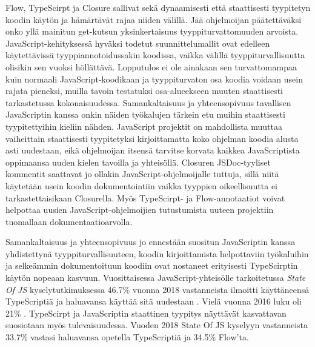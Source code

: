 Flow, TypeScirpt ja Closure sallivat sekä dynaamisesti että
staattisesti tyypitetyn koodin käytön ja hämärtävät rajaa niiden välillä.
Jää ohjelmoijan päätettäväksi onko yllä mainitun get-kutsun yksinkertaisuus
tyyppiturvattomuuden arvoista. JavaScript-kehityksessä hyväksi todetut
suunnittelumallit ovat edelleen käytettävissä tyyppiannotoidussakin
koodissa, vaikka välillä tyyppiturvallisuutta olisikin sen vuoksi höllättävä.
Lopputulos ei ole ainakaan sen turvattomampaa kuin normaali JavaScript-koodikaan
ja tyyppiturvaton osa koodia voidaan usein rajata pieneksi, muilla tavoin
testatuksi osa-alueekseen muuten staattisesti tarkastetussa kokonaisuudessa.
Samankaltaisuus ja yhteensopivuus tavallisen JavaScriptin kanssa onkin
näiden työkalujen tärkein etu muihin staattisesti tyypitettyihin kieliin
nähden. JavaScript projektit on mahdollista muuttaa vaiheittain staattisesti
tyypitetyksi kirjoittamatta koko ohjelman koodia alusta asti uudestaan, eikä
ohjelmoijan itsensä tarvitse korvata kaikkea JavaScriptista oppimaansa
uuden kielen tavoilla ja yhteisöllä. Closuren JSDoc-tyyliset kommentit
saattavat jo ollakin JavaScript-ohjelmoijalle tuttuja, sillä niitä käytetään
usein koodin dokumentointiin vaikka tyyppien oikeellisuutta ei
tarkastettaisikaan Closurella. Myös TypeScirpt- ja Flow-annotaatiot voivat
helpottaa uusien JavaScript-ohjelmoijien tutustumista uuteen projektiin
tuomallaan dokumentaatioarvolla.

Samankaltaisuus ja yhteensopivuus jo ennestään suositun JavaScriptin kanssa
yhdistettynä tyyppiturvallisuuteen, koodin kirjoittamista helpottaviin
työkaluihin ja selkeämmin dokumentoituun koodiin ovat nostaneet erityisesti
TypeScirptin käytön nopeaan kasvuun. Vuosittaisessa JavaScript-yhteisölle
tarkoitetussa \textit{State Of JS} kyselytutkimuksessa 46.7\% vuonna 2018
vastanneista ilmoitti käyttäneensä TypeScriptiä ja haluavansa
käyttää sitä uudestaan \cite{StateOfJs2018}.
Vielä vuonna 2016 luku oli 21\% \cite{StateOfJs2016}. TypeScirpt ja
JavaScriptin staattinen tyypitys näyttävät kasvattavan suosiotaan myös
tulevaisuudessa. Vuoden 2018 State Of JS kyselyyn vastanneista 33.7\%
vastasi haluavansa\newline
opetella TypeScriptiä ja 34.5\% Flow'ta.
